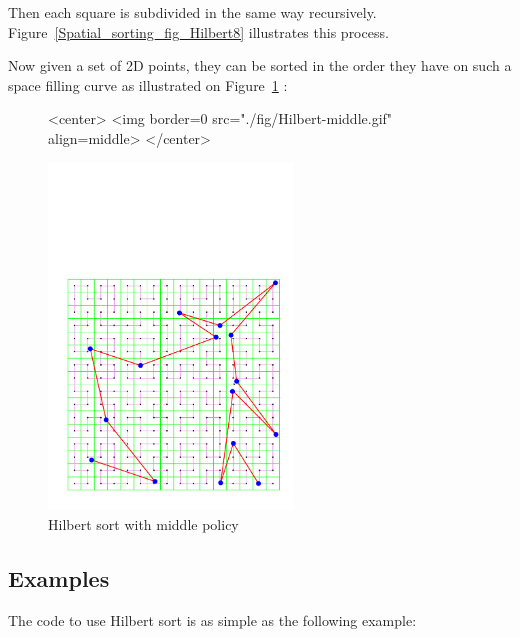 Then each square is subdivided in the same way recursively.
Figure~\ref{Spatial_sorting_fig_Hilbert8} illustrates this process.

Now given a set of 2D points, they can be sorted in the order they have on such
a space filling curve as illustrated on Figure~\ref{Spatial_sorting_fig_Hilbert_middle} :

\begin{figure}[h]
\begin{ccHtmlOnly}
<center>
<img border=0 src="./fig/Hilbert-middle.gif" align=middle>
</center>
\end{ccHtmlOnly} 
\begin{ccTexOnly}
\begin{center}
\includegraphics[width=6.5cm]{Spatial_sorting/fig/Hilbert-middle}
\end{center}
\end{ccTexOnly}
\caption{Hilbert sort with middle policy
\label{Spatial_sorting_fig_Hilbert_middle}}
\end{figure}

\begin{ccTexOnly}
\newpage
\end{ccTexOnly}

\subsection{Examples}

The code to use Hilbert sort is as simple as the following example:




